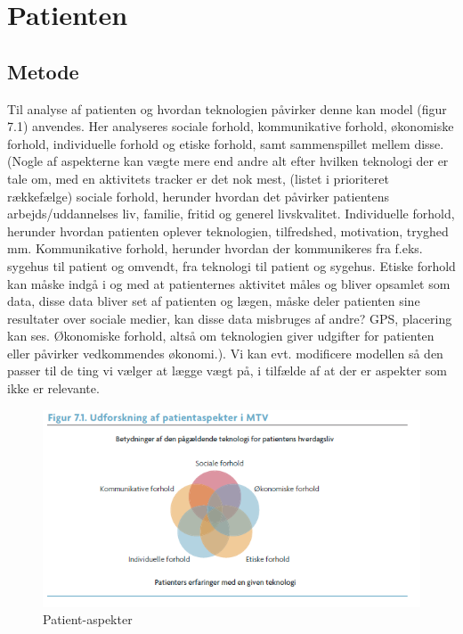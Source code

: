 \chapter{Patienten}
\section{Metode}
Til analyse af patienten og hvordan teknologien påvirker denne kan model (figur 7.1) anvendes. Her analyseres sociale forhold, kommunikative forhold, økonomiske forhold, individuelle forhold og etiske forhold, samt sammenspillet mellem disse. (Nogle af aspekterne kan vægte mere end andre alt efter hvilken teknologi der er tale om, med en aktivitets tracker er det nok mest, (listet i prioriteret rækkefælge) sociale forhold, herunder hvordan det påvirker patientens arbejds/uddannelses liv, familie, fritid og generel livskvalitet. Individuelle forhold, herunder hvordan patienten oplever teknologien, tilfredshed, motivation, tryghed mm. Kommunikative forhold, herunder hvordan der kommunikeres fra f.eks. sygehus til patient og omvendt, fra teknologi til patient og sygehus. Etiske forhold kan måske indgå i og med at patienternes aktivitet måles og bliver opsamlet som data, disse data bliver set af patienten og lægen, måske deler patienten sine resultater over sociale medier, kan disse data misbruges af andre? GPS, placering kan ses. Økonomiske forhold, altså om teknologien giver udgifter for patienten eller påvirker vedkommendes økonomi.).
Vi kan evt. modificere modellen så den passer til de ting vi vælger at lægge vægt på, i tilfælde af at der er aspekter som ikke er relevante. 

\begin{figure}[H]
\centering
\includegraphics[width=1\textwidth]{figures/patientaspekter}
\caption{Patient-aspekter}
\label{fig:patientaspekter}
\end{figure}


